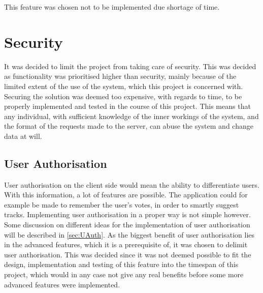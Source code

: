 This feature was chosen not to be implemented due shortage of time.

\section{Security}
It was decided to limit the project from taking care of security. This was decided as functionality was prioritised higher than security, mainly because of the limited extent of the use of the system, which this project is concerned with. Securing the solution was deemed too expensive, with regards to time, to be properly implemented and tested in the course of this project.
This means that any individual, with sufficient knowledge of the inner workings of the system, and the format of the requests made to the server, can abuse the system and change data at will.

\subsection{User Authorisation}
\label{par:user_authorization}
User authorisation on the client side would mean the ability to differentiate users. With this information, a lot of features are possible. The application could for example be made to remember the user's votes, in order to smartly suggest tracks.
Implementing user authorisation in a proper way is not simple however. Some discussion on different ideas for the implementation of user authorisation will be described in \cref{sec:UAuth}.
As the biggest benefit of user authorisation lies in the advanced features, which it is a prerequisite of, it was chosen to delimit user authorisation. This was decided since it was not deemed possible to fit the design, implementation and testing of this feature into the timespan of this project, which would in any case not give any real benefits before some more advanced features were implemented.
